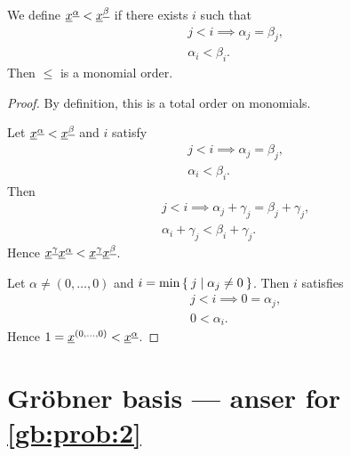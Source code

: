 \begin{example}
  We define ${\underline{x}}^{\underline{\alpha}} < {\underline{x}}^{\underline{\beta}} $
  if there exists $i$ such that
  \begin{align*}
    &j<i\implies \alpha_j=\beta_j,\\
    &\alpha_i < \beta_i.
  \end{align*}
  Then $\leq$ is a monomial order.
\end{example}
\begin{proof}
  By definition,
  this is a total order on monomials.

  Let ${\underline{x}}^{\underline{\alpha}} < {\underline{x}}^{\underline{\beta}}$ and
   $i$ satisfy
  \begin{align*}
    &j<i\implies \alpha_j=\beta_j,\\
    &\alpha_i < \beta_i.
  \end{align*}
  Then 
  \begin{align*}
    &j<i\implies \alpha_j+\gamma_j=\beta_j+\gamma_j,\\
    &\alpha_i+\gamma_j < \beta_i+\gamma_j.
  \end{align*}
  Hence $ {\underline{x}}^{\underline{\gamma}}{\underline{x}}^{\underline{\alpha}}< {\underline{x}}^{\underline{\gamma}}{\underline{x}}^{\underline{\beta}}$.


  Let $\alpha\neq (0,\ldots,0)$ and $i=\min\Set{j|\alpha_j\neq 0}$.
  Then
   $i$ satisfies
  \begin{align*}
    &j<i\implies 0=\alpha_j,\\
    &0<\alpha_i.
  \end{align*}
  Hence $1={\underline{x}}^{(0,\ldots,0)} < {\underline{x}}^{\underline{\alpha}}$.
\end{proof}

\section{Gr\"obner basis --- anser for \cref{gb:prob:2}}
